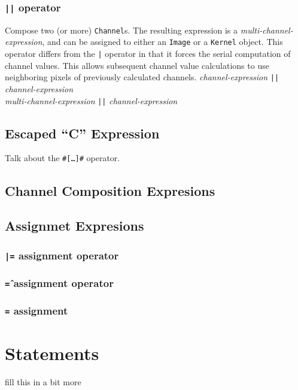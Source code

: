 \subsubsection{\texttt{||} operator}
\label{sssec:doublebarop}
Compose two (or more) \texttt{Channel}s. The resulting expression is a
\emph{multi-channel-expression}, and can be assigned to either an \texttt{Image}
or a \texttt{Kernel} object. This operator differs from the \texttt{|} operator in that
it forces the serial computation of channel values. This allows subsequent channel
value calculations to use neighboring pixels of previously calculated channels.
\startsyn
\emph{channel-expression} \texttt{||} \emph{channel-expression} \\
\emph{multi-channel-expression} \texttt{||} \emph{channel-expression}
\stopsyn

\subsection{Escaped ``C'' Expression}
\label{ssec:escapedC}
Talk about the \texttt{\#[\ldots]\#} operator.

\subsection{Channel Composition Expresions}

\subsection{Assignmet Expresions}
\label{ssec:assignment}

\subsubsection{\texttt{|=} assignment operator}

\subsubsection{\texttt{\^=} assignment operator}

\subsubsection{\texttt{=} assignment}

\section{Statements}
\label{sec:statements}
fill this in a bit more

